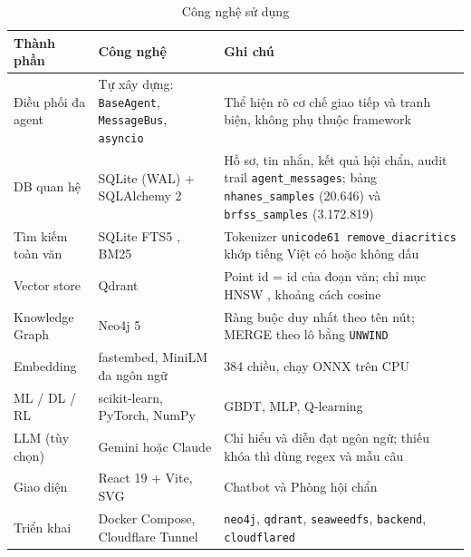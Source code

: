\begin{table}[H]
\centering
\caption{Công nghệ sử dụng}
\label{tab:tech}
\small
\begin{tabularx}{\linewidth}{@{}L{3.2cm}L{4.2cm}Y@{}}
\toprule
\textbf{Thành phần} & \textbf{Công nghệ} & \textbf{Ghi chú} \\
\midrule
Điều phối đa agent & Tự xây dựng: \texttt{BaseAgent}, \texttt{MessageBus}, \texttt{asyncio} & Thể hiện rõ cơ chế giao tiếp và tranh biện, không phụ thuộc framework \\
DB quan hệ & SQLite (WAL) + SQLAlchemy 2 & Hồ sơ, tin nhắn, kết quả hội chẩn, audit trail \texttt{agent\_messages}; bảng \texttt{nhanes\_samples} (20.646) và \texttt{brfss\_samples} (3.172.819) \\
Tìm kiếm toàn văn & SQLite FTS5 \cite{sqlitefts5}, BM25 & Tokenizer \texttt{unicode61 remove\_diacritics} khớp tiếng Việt có hoặc không dấu \\
Vector store & Qdrant \cite{qdrant} & Point id = id của đoạn văn; chỉ mục HNSW \cite{malkov2018}, khoảng cách cosine \\
Knowledge Graph & Neo4j 5 \cite{neo4j} & Ràng buộc duy nhất theo tên nút; MERGE theo lô bằng \texttt{UNWIND} \\
Embedding & fastembed, MiniLM đa ngôn ngữ \cite{reimers2020} & 384 chiều, chạy ONNX trên CPU \\
ML / DL / RL & scikit-learn, PyTorch, NumPy & GBDT, MLP, Q-learning \\
LLM (tùy chọn) & Gemini hoặc Claude & Chỉ hiểu và diễn đạt ngôn ngữ; thiếu khóa thì dùng regex và mẫu câu \\
Giao diện & React 19 + Vite, SVG & Chatbot và Phòng hội chẩn \\
Triển khai & Docker Compose, Cloudflare Tunnel \cite{cloudflaretunnel} & \texttt{neo4j}, \texttt{qdrant}, \texttt{seaweedfs}, \texttt{backend}, \texttt{cloudflared} \\
\bottomrule
\end{tabularx}
\end{table}
